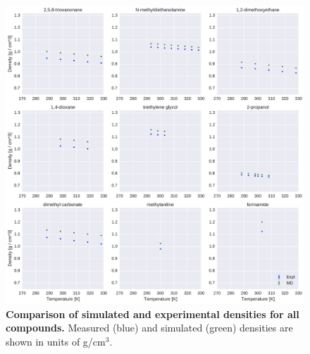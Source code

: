 \documentclass[journal=jacsat,manuscript=article]{achemso}
\begin{document}
\begin{figure}[alldensity]

\ContinuedFloat

\includegraphics[width=\textwidth]{./figures/densities_versus_temperature_part3.pdf}

\caption{{\bf Comparison of simulated and experimental densities for all compounds.} 
Measured (blue) and simulated (green) densities are shown in units of g/cm$^{3}$.
\label{figure:AllDensities}
}

\end{figure}
\end{document}
